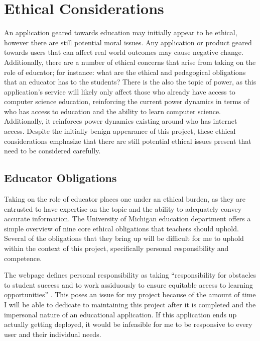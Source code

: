 \documentclass[10pt,twocolumn]{article}
\begin{document}
\section{Ethical Considerations}

An application geared towards education may initially appear to be ethical, however there are still potential moral issues. 
Any application or product geared towards 
users that can affect real world outcomes may cause negative change. 
Additionally, there are a number of ethical concerns that arise from taking on the role of educator; for instance: what 
are the ethical and pedagogical obligations that an educator has to the students? There is the also the topic of power, as this 
application’s service will likely only affect those who already have 
access to computer science education, reinforcing the current power dynamics in terms of who has access to education and 
the ability to learn computer science. Additionally, it reinforces power dynamics existing around who has internet 
access. Despite the initially benign appearance of this project, these ethical 
considerations emphasize that there are still potential ethical issues present that need to be considered carefully. 

\subsection{Educator Obligations}

Taking on the role of educator places one under an ethical burden, as they are entrusted to have expertise on 
the topic and the ability to adequately convey accurate information. The University of Michigan education department 
offers a simple overview of nine core ethical obligations that teachers should uphold. Several of the obligations that 
they bring up will be difficult for me to uphold within the context of this project, specifically
personal responsibility and competence. 

The webpage defines personal responsibility as taking “responsibility for obstacles to student success and to work 
assiduously to ensure equitable access to learning opportunities” \cite{MichiganEducation}. This poses an issue for 
my project because of the amount of time I will be able to dedicate to maintaining this project after it is completed 
and the impersonal nature of an educational application. If this application ends up actually getting deployed, it would 
be infeasible for me to be responsive to every user and their individual needs. 
\end{document}
